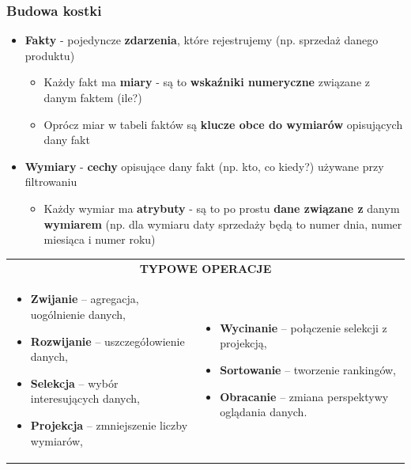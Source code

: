 \documentclass[a4paper]{article}
\begin{document}
    \subsubsection{Budowa kostki}
    \begin{itemize}[noitemsep]
        \item \textbf{Fakty} - pojedyncze \textbf{zdarzenia}, które rejestrujemy (np. sprzedaż danego produktu)
        \begin{itemize}[noitemsep]
            \item Każdy fakt ma \textbf{miary} - są to \textbf{wskaźniki numeryczne} związane z danym faktem (ile?)
            \item Oprócz miar w tabeli faktów są \textbf{klucze obce do wymiarów} opisujących dany fakt
        \end{itemize}
        \item \textbf{Wymiary} - \textbf{cechy} opisujące dany fakt (np. kto, co kiedy?) używane przy filtrowaniu
        \begin{itemize}[noitemsep]
            \item Każdy wymiar ma \textbf{atrybuty} - są to po prostu \textbf{dane związane z} danym \textbf{wymiarem}
            (np. dla wymiaru daty sprzedaży będą to numer dnia, numer miesiąca i numer roku)
        \end{itemize}
    \end{itemize}

    \begin{table}[H]
        \begin{center}
            \begin{tabular}{p{8cm} p{8cm}}
                \multicolumn{2}{c}{\textbf{TYPOWE OPERACJE}} \\
                \begin{itemize}[noitemsep]
                    \item \textbf{Zwijanie} – agregacja, uogólnienie danych,
                    \item \textbf{Rozwijanie} – uszczegółowienie danych,
                    \item \textbf{Selekcja} – wybór interesujących danych,
                    \item \textbf{Projekcja} – zmniejszenie liczby wymiarów,
                \end{itemize}
                &
                \begin{itemize}[noitemsep]
                    \item \textbf{Wycinanie} – połączenie selekcji z projekcją,
                    \item \textbf{Sortowanie} – tworzenie rankingów,
                    \item \textbf{Obracanie} – zmiana perspektywy oglądania danych.
                \end{itemize} \\
            \end{tabular}
        \end{center}
    \end{table}
\end{document}
